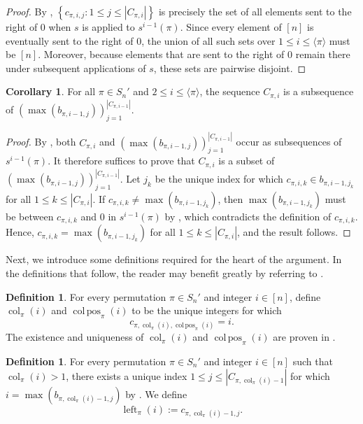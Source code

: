 \documentclass[12pt]{amsart}
\DeclareMathOperator{\col}{col}
\DeclareMathOperator{\colpos}{col\,pos}
\DeclareMathOperator{\leftof}{left}
\newcommand{\met}[1]{\langle #1\rangle}
\theoremstyle{definition}
\newtheorem{corollary}[theorem]{Corollary}
\newtheorem{definition}[theorem]{Definition}
\begin{document}
\begin{proof}
By , $\left\{c_{\pi,i,j}:1\le j\le |C_{\pi,i}|\right\}$ is precisely the set of all elements sent to the right of $0$ when $s$ is applied to $s^{i-1}(\pi)$. Since every element of $[n]$ is eventually sent to the right of $0$, the union of all such sets over $1\le i\le \met{\pi}$ must be $[n]$. Moreover, because elements that are sent to the right of $0$ remain there under subsequent applications of $s$, these sets are pairwise disjoint.
\end{proof}
\begin{corollary}\label{left_well_defined}
For all $\pi\in S_n'$ and $2\le i\le \met{\pi}$, the sequence $C_{\pi,i}$ is a subsequence of $(\max(b_{\pi,i-1,j}))_{j=1}^{|C_{\pi,i-1}|}$.
\end{corollary}
\begin{proof}
By , both $C_{\pi,i}$ and $(\max(b_{\pi,i-1,j}))_{j=1}^{|C_{\pi,i-1}|}$ occur as subsequences of $s^{i-1}(\pi)$. It therefore suffices to prove that $C_{\pi,i}$ is a subset of $(\max(b_{\pi,i-1,j}))_{j=1}^{|C_{\pi,i-1}|}$. Let $j_k$ be the unique index for which $c_{\pi,i,k}\in b_{\pi,i-1,j_k}$ for all $1\le k\le |C_{\pi,i}|$. If $c_{\pi,i,k}\neq \max(b_{\pi,i-1,j_k})$, then $\max(b_{\pi,i-1,j_k})$ must be between $c_{\pi,i,k}$ and $0$ in $s^{i-1}(\pi)$ by , which contradicts the definition of $c_{\pi,i,k}$. Hence, $c_{\pi,i,k} = \max(b_{\pi,i-1,j_k})$ for all $1\le k\le |C_{\pi,i}|$, and the result follows.
\end{proof}
Next, we introduce some definitions required for the heart of the argument. In the definitions that follow, the reader may benefit greatly by referring to .
\begin{definition}
For every permutation $\pi\in S_n'$ and integer $i\in[n]$, define $\col_{\pi}(i)$ and $\colpos_{\pi}(i)$ to be the unique integers for which \[c_{\pi,\col_{\pi}(i),\colpos_{\pi}(i)}=i.\] The existence and uniqueness of $\col_{\pi}(i)$ and $\colpos_{\pi}(i)$ are proven in .
\end{definition}
\begin{definition}
For every permutation $\pi\in S_n'$ and integer $i\in[n]$ such that $\col_{\pi}(i)>1$, there exists a unique index $1\le j\le |C_{\pi,\col_{\pi}(i)-1}|$ for which $i=\max(b_{\pi,\col_{\pi}(i)-1,j})$ by . We define \[\leftof_{\pi}(i):=c_{\pi,\col_{\pi}(i)-1,j}.\]
\end{definition}
\end{document}
